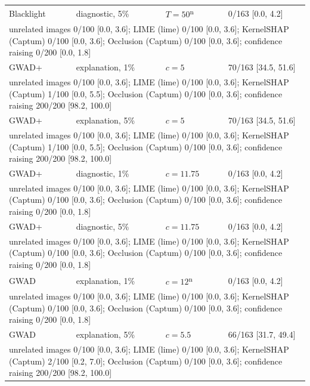 \begin{footnotesize}
\begin{longtable}{p{1.6cm}p{2.6cm}p{2.8cm}p{4.6cm}}
Blacklight & diagnostic, 5\% & $T=50$\textsuperscript{n} & 0/163 [0.0, 4.2] \\
\multicolumn{4}{p{12.8cm}}{\raggedright\quad unrelated images 0/100 [0.0, 3.6]; LIME (lime) 0/100 [0.0, 3.6]; KernelSHAP (Captum) 0/100 [0.0, 3.6]; Occlusion (Captum) 0/100 [0.0, 3.6]; confidence raising 0/200 [0.0, 1.8]} \\[4pt]
GWAD+ & explanation, 1\% & $c=5$ & 70/163 [34.5, 51.6] \\
\multicolumn{4}{p{12.8cm}}{\raggedright\quad unrelated images 0/100 [0.0, 3.6]; LIME (lime) 0/100 [0.0, 3.6]; KernelSHAP (Captum) 1/100 [0.0, 5.5]; Occlusion (Captum) 0/100 [0.0, 3.6]; confidence raising 200/200 [98.2, 100.0]} \\[4pt]
GWAD+ & explanation, 5\% & $c=5$ & 70/163 [34.5, 51.6] \\
\multicolumn{4}{p{12.8cm}}{\raggedright\quad unrelated images 0/100 [0.0, 3.6]; LIME (lime) 0/100 [0.0, 3.6]; KernelSHAP (Captum) 1/100 [0.0, 5.5]; Occlusion (Captum) 0/100 [0.0, 3.6]; confidence raising 200/200 [98.2, 100.0]} \\[4pt]
GWAD+ & diagnostic, 1\% & $c=11.75$ & 0/163 [0.0, 4.2] \\
\multicolumn{4}{p{12.8cm}}{\raggedright\quad unrelated images 0/100 [0.0, 3.6]; LIME (lime) 0/100 [0.0, 3.6]; KernelSHAP (Captum) 0/100 [0.0, 3.6]; Occlusion (Captum) 0/100 [0.0, 3.6]; confidence raising 0/200 [0.0, 1.8]} \\[4pt]
GWAD+ & diagnostic, 5\% & $c=11.75$ & 0/163 [0.0, 4.2] \\
\multicolumn{4}{p{12.8cm}}{\raggedright\quad unrelated images 0/100 [0.0, 3.6]; LIME (lime) 0/100 [0.0, 3.6]; KernelSHAP (Captum) 0/100 [0.0, 3.6]; Occlusion (Captum) 0/100 [0.0, 3.6]; confidence raising 0/200 [0.0, 1.8]} \\[4pt]
GWAD & explanation, 1\% & $c=12$\textsuperscript{n} & 0/163 [0.0, 4.2] \\
\multicolumn{4}{p{12.8cm}}{\raggedright\quad unrelated images 0/100 [0.0, 3.6]; LIME (lime) 0/100 [0.0, 3.6]; KernelSHAP (Captum) 0/100 [0.0, 3.6]; Occlusion (Captum) 0/100 [0.0, 3.6]; confidence raising 0/200 [0.0, 1.8]} \\[4pt]
GWAD & explanation, 5\% & $c=5.5$ & 66/163 [31.7, 49.4] \\
\multicolumn{4}{p{12.8cm}}{\raggedright\quad unrelated images 0/100 [0.0, 3.6]; LIME (lime) 0/100 [0.0, 3.6]; KernelSHAP (Captum) 2/100 [0.2, 7.0]; Occlusion (Captum) 0/100 [0.0, 3.6]; confidence raising 200/200 [98.2, 100.0]} \\[4pt]

\end{longtable}
\end{footnotesize}
